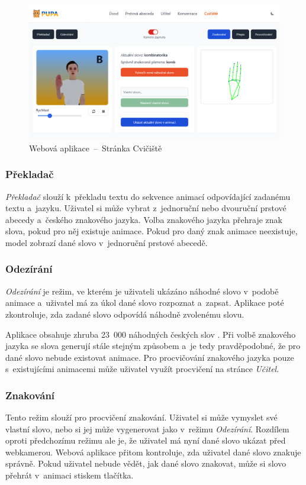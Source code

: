 \documentclass[
  master,
  program=ainfvs,
  biblatex,
  figures=true,
  tables=false,
  sourcecodes=true,
  glossaries,
  index
]{kidiplom}
\begin{document}
        \begin{figure}[htbp]
            \centering
            \includegraphics[width=1\columnwidth]{graphics/playground.png}
            \caption{Webová aplikace~--~Stránka Cvičiště}
            \label{playground}
        \end{figure}

        
        \subsubsection{Překladač}
            \emph{Překladač} slouží k~překladu textu do sekvence animací odpovídající zadanému textu a~jazyku. Uživatel si může vybrat z~jednoruční nebo dvouruční prstové abecedy a~českého znakového jazyka. Volba znakového jazyka přehraje znak slova, pokud pro něj existuje animace. Pokud pro daný znak animace neexistuje, model zobrazí dané slovo v~jednoruční prstové abecedě.

        \subsubsection{Odezírání}
            \emph{Odezírání} je režim, ve kterém je uživateli ukázáno náhodné slovo v~podobě animace a~uživatel má za úkol dané slovo rozpoznat a~zapsat. Aplikace poté zkontroluje, zda zadané slovo odpovídá náhodně zvolenému slovu. 
            
            Aplikace obsahuje zhruba 23~000 náhodných českých slov \cite{ceska-slova}. Při volbě znakového jazyka se slova generují stále stejným způsobem a~je tedy pravděpodobné, že pro dané slovo nebude existovat animace. Pro procvičování znakového jazyka pouze s~existujícími animacemi může uživatel využít procvičení na stránce \emph{Učitel}.
        
        \subsubsection{Znakování}
            Tento režim slouží pro procvičení znakování. Uživatel si může vymyslet své vlastní slovo, nebo si jej může vygenerovat jako v~režimu \emph{Odezírání}. Rozdílem oproti předchozímu režimu ale je, že uživatel má nyní dané slovo ukázat před webkamerou. Webová aplikace přitom kontroluje, zda uživatel dané slovo znakuje správně. Pokud uživatel nebude vědět, jak dané slovo znakovat, může si slovo přehrát v~animaci stiskem tlačítka.
        
\end{document}
